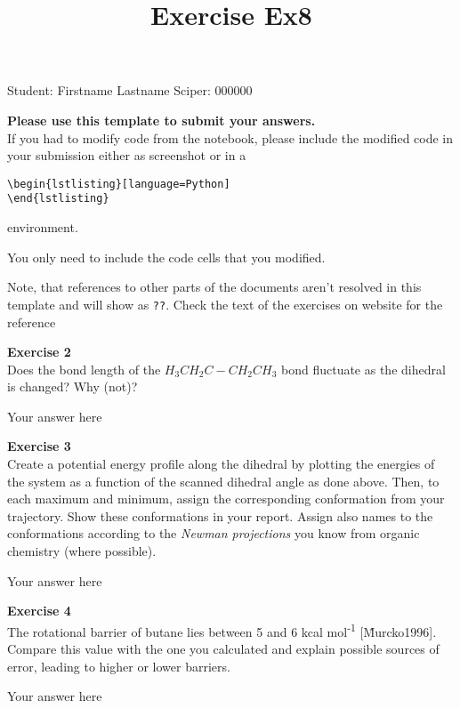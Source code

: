 \documentclass{article}
\title{Exercise Ex8}
\begin{document}
\maketitle\maketitle

Student:  Firstname Lastname    Sciper: 000000

\begin{mdframed}
\textbf{Please use this template to submit your answers.}\\
If you had to modify code from the notebook, please include the modified code in your submission either as screenshot or in a

\begin{verbatim}
\begin{lstlisting}[language=Python]
\end{lstlisting}
\end{verbatim}

environment.

You only need to include the code cells that you modified.

Note, that references to other parts of the documents aren't resolved in this template and will show as \texttt{??}. Check the text of the exercises on website for the reference
\end{mdframed}

\begin{mdframed}
\textbf{Exercise 2}\\
Does the bond length of the $H_3CH_2C -CH_2CH_3$ bond fluctuate as
the dihedral is changed? Why (not)?
\end{mdframed}

Your answer here

\begin{mdframed}
\textbf{Exercise 3}\\
Create a potential energy profile along the dihedral by plotting the
energies of the system as a function of the scanned dihedral angle as done above.
Then, to each maximum and minimum, assign the corresponding
conformation from your trajectory. Show these conformations in your
report.
Assign also names to the conformations according to the \textit{Newman
projections} you know from organic chemistry (where possible).
\end{mdframed}

Your answer here

\begin{mdframed}
\textbf{Exercise 4}\\
The rotational barrier of butane lies between 5 and 6 kcal
mol\textsuperscript{-1} [\^Murcko1996]. Compare this value with the one you calculated and explain possible sources of error, leading to higher or lower barriers.
\end{mdframed}

Your answer here

\end{document}
